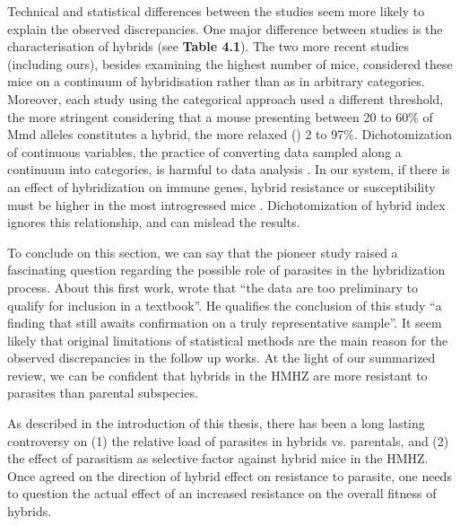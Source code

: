 Technical and statistical differences between the studies seem more likely to explain the observed discrepancies. One major difference between studies is the characterisation of hybrids (see \textbf{Table 4.1}). The two more recent studies (including ours), besides examining the highest number of mice, considered these mice on a continuum of hybridisation rather than as in arbitrary categories. Moreover, each study using the categorical approach used a different threshold, the more stringent \cite{moulia_wormy_1991} considering that a mouse presenting between 20 to 60\% of Mmd alleles constitutes a hybrid, the more relaxed (\cite{moulia_experimental_1993}) 2 to 97\%. Dichotomization of continuous variables, the practice of converting data sampled along a continuum into categories, is harmful to data analysis \citep{maccallum_practice_2002}. In our system, if there is an effect of hybridization on immune genes, hybrid resistance or susceptibility must be higher in the most introgressed mice \citep{baird_where_2012}. Dichotomization of hybrid index ignores this relationship, and can mislead the results. 
\par
To conclude on this section, we can say that the pioneer study \cite{sage_wormy_1986} raised a fascinating question regarding the possible role of parasites in the hybridization process. About this first work, \cite{klein_book_1988} wrote that “the data are too preliminary to qualify for inclusion in a textbook”. He qualifies the conclusion of this study “a finding that still awaits confirmation on a truly representative sample”. It seem likely that original limitations of statistical methods are the main reason for the observed discrepancies in the follow up works. At the light of our summarized review, we can be confident that hybrids in the HMHZ are more resistant to parasites than parental subspecies.
\par
As described in the introduction of this thesis, there has been a long lasting controversy on (1) the relative load of parasites in hybrids vs. parentals, and (2) the effect of parasitism as selective factor against hybrid mice in the HMHZ. Once agreed on the direction of hybrid effect on resistance to parasite, one needs to question the actual effect of an increased resistance on the overall fitness of hybrids.

